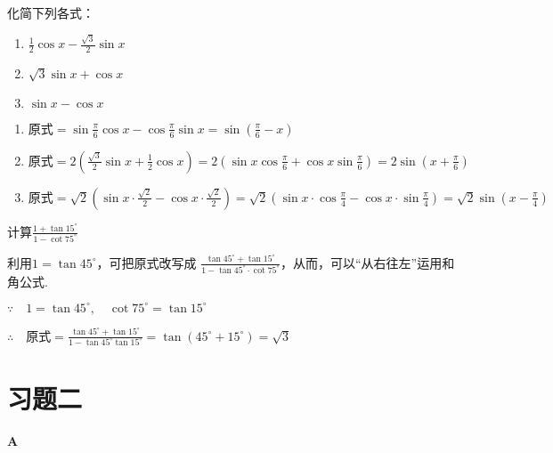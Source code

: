 \begin{example}
化简下列各式：
\begin{multicols}{2}
\begin{enumerate}[(1)]
    \item $\frac{1}{2}\cos x-\frac{\sqrt{3}}{2}\sin x$
    \item $\sqrt{3}\sin x+\cos x$
    \item $\sin x-\cos x$
\end{enumerate}
\end{multicols}
\end{example}

\begin{solution}
\begin{enumerate}[(1)]
    \item $\text{原式}=\sin\frac{\pi}{6}\cos x-\cos\frac{\pi}{6}\sin x=\sin\left(\frac{\pi}{6}-x\right)$
    \item $\text{原式}=2\left(\frac{\sqrt{3}}{2}\sin x+\frac{1}{2}\cos x\right)=2\left(\sin x\cos\frac{\pi}{6}+\cos x\sin\frac{\pi}{6}\right)=2\sin\left(x+\frac{\pi}{6}\right)$
    \item $\text{原式}=\sqrt{2}\left(\sin x\cdot \frac{\sqrt{2}}{2}-\cos x\cdot \frac{\sqrt{2}}{2}\right)=\sqrt{2}\left(\sin x\cdot \cos\frac{\pi}{4}-\cos x\cdot \sin\frac{\pi}{4}\right)=\sqrt{2}\sin\left(x-\frac{\pi}{4}\right)$
\end{enumerate}
\end{solution}

\begin{example}
计算$\frac{1+\tan15^{\circ}}{1-\cot75^{\circ}}$
\end{example}

\begin{analyze}
    利用$1=\tan45^{\circ}$，可把原式改写成
$\frac{\tan45^{\circ}+\tan15^{\circ}}{1-\tan45^{\circ}\cdot \cot75^{\circ}}$，从而，可以“从右往左”运用和角公式.
\end{analyze}

\begin{solution}
$\because\quad 1=\tan 45^{\circ},\quad \cot75^{\circ}=\tan 15^{\circ}$

$\therefore\quad \text{原式}=\frac{\tan45^{\circ}+\tan15^{\circ}}{1-\tan45^{\circ} \tan15^{\circ}}=\tan(45^{\circ}+15^{\circ})=\sqrt{3}$
\end{solution}

\section*{习题二}
\begin{center}
    \bfseries A
\end{center}

